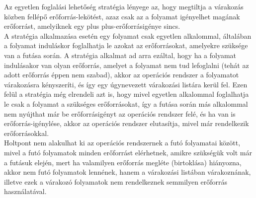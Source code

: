 \documentclass[tikz,12pt,margin=0px]{article}
\newcommand\lword[1]{\leavevmode\nobreak\hskip0pt plus\linewidth\penalty50\hskip0pt plus-\linewidth\nobreak #1}
\begin{document}
    Az egyetlen foglalási lehetőség stratégia lényege az, hogy megtiltja a várakozás közben fellépő erőforrás-lekötést, azaz csak az a folyamat igényelhet magának erőforrást, amelyiknek egy \lword{erőforrásigénye} sincs.\\

    \noindent A stratégia alkalmazása esetén egy folyamat csak egyetlen alkalommal, általában a folyamat induláskor foglalhatja le azokat az erőforrásokat, amelyekre szüksége van a futása során. A stratégia alkalmat ad arra ezáltal, hogy ha a folyamat indulásakor van olyan erőforrás, amelyet a folyamat nem tud lefoglalni (tehát az adott erőforrás éppen nem szabad), akkor az operációs rendszer a folyamatot várakozásra kényszeríti, és így egy úgynevezett várakozási listára kerül fel. Ezen felül a stratégia még elrendeli azt is, hogy mivel egyetlen alkalommal foglalhatja le csak a folyamat a szükséges erőforrásokat, így a futása során más alkalommal nem nyújthat már be erőforrásigényt az operációs rendszer felé, és ha van is erőforrás-igénylése, akkor az operációs rendszer elutasítja, mivel már rendelkezik erőforrásokkal.\\

    \noindent Holtpont nem alakulhat ki az operációs rendszernek a futó folyamatai között, mivel a futó folyamatok minden erőforrást elérhetnek, amikre szükségük volt már a futásuk elején, mert ha valamilyen erőforrás megléte (birtoklása) hiányozna, akkor nem futó folyamatok lennének, hanem a várakozási listában várakoznának, illetve ezek a várakozó folyamatok nem rendelkeznek semmilyen erőforrás használatával.
\end{document}
